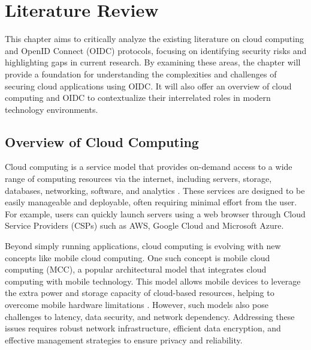 \chapter{Literature Review}

This chapter aims to critically analyze the existing literature on cloud computing and OpenID Connect (OIDC) protocols, focusing on identifying security risks and highlighting gaps in current research. By examining these areas, the chapter will provide a foundation for understanding the complexities and challenges of securing cloud applications using OIDC. It will also offer an overview of cloud computing and OIDC to contextualize their interrelated roles in modern technology environments.

\section{Overview of Cloud Computing}
Cloud computing is a service model that provides on-demand access to a wide range of computing resources via the internet, including servers, storage, databases, networking, software, and analytics \citep{rashid2019cloud}. These services are designed to be easily manageable and deployable, often requiring minimal effort from the user. For example, users can quickly launch servers using a web browser through Cloud Service Providers (CSPs) such as AWS, Google Cloud and Microsoft Azure. 

Beyond simply running applications, cloud computing is evolving with new concepts like mobile cloud computing. One such concept is mobile cloud computing (MCC), a popular architectural model that integrates cloud computing with mobile technology. This model allows mobile devices to leverage the extra power and storage capacity of cloud-based resources, helping to overcome mobile hardware limitations \citep{mcc}. However, such models also pose challenges to latency, data security, and network dependency. Addressing these issues requires robust network infrastructure, efficient data encryption, and effective management strategies to ensure privacy and reliability.

